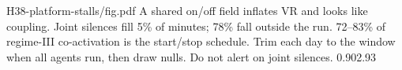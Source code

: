 {H38-platform-stalls/fig.pdf}
{A shared on/off field inflates VR and looks like coupling.}
{Joint silences fill 5\% of minutes; 78\% fall outside the run. 72--83\% of regime-III co-activation is the start/stop schedule.}
{Trim each day to the window when all agents run, then draw nulls. Do not alert on joint silences.}
{0.90}{2.93}
